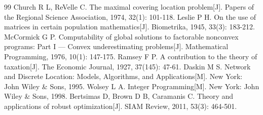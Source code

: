 \documentclass[12pt,a4paper]{ctexart}
\begin{document}
\begin{thebibliography}{99}
 Church R L, ReVelle C. The maximal covering location problem[J]. Papers of the Regional Science Association, 1974, 32(1): 101-118.
 Leslie P H. On the use of matrices in certain population mathematics[J]. Biometrika, 1945, 33(3): 183-212.
 McCormick G P. Computability of global solutions to factorable nonconvex programs: Part I — Convex underestimating problems[J]. Mathematical Programming, 1976, 10(1): 147-175.
 Ramsey F P. A contribution to the theory of taxation[J]. The Economic Journal, 1927, 37(145): 47-61.
 Daskin M S. Network and Discrete Location: Models, Algorithms, and Applications[M]. New York: John Wiley \& Sons, 1995.
 Wolsey L A. Integer Programming[M]. New York: John Wiley \& Sons, 1998.
 Bertsimas D, Brown D B, Caramanis C. Theory and applications of robust optimization[J]. SIAM Review, 2011, 53(3): 464-501.
\end{thebibliography}



\end{document}
